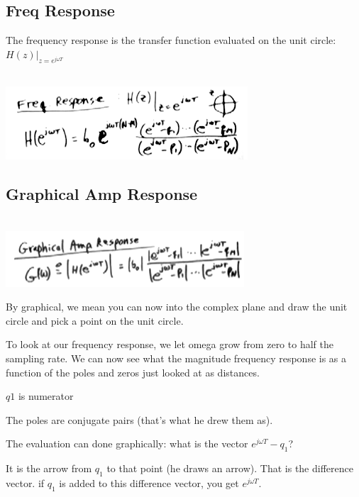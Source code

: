 \subsection*{Freq Response}

The frequency response is the transfer function evaluated on the
unit circle: $H(z)\vert_{z = e^{j\omega T}}$

\\
\includegraphics[scale=0.8]{frames/12c}

\subsection*{Graphical Amp Response}



\\
\includegraphics[scale=0.8]{frames/12d}

By graphical, we mean you can now into the complex plane and draw
the unit circle and pick a point on the unit circle. 

To look at our frequency response, we let omega grow from zero to 
half the sampling rate. We can now see what the magnitude frequency response
is as a function of the poles and zeros just looked at as distances. 

$q1$ is numerator

The poles are conjugate pairs (that's what he drew them as). 

The evaluation can done graphically: what is the vector $e^{j\omega T} - q_1$?

It is the arrow from $q_1$ to that point (he draws an arrow). That is the
difference vector. if $q_1$ is added to this difference vector, you get 
$e^{j \omega T}$. 

